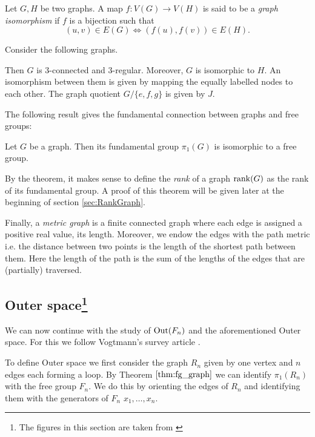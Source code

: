 \begin{definition}
	Let $G,H$ be two graphs. A map $f: V(G) \to V(H)$ is said to be a \emph{graph isomorphism} if $f$ is a bijection such that
	\[
		(u,v) \in E(G) \Leftrightarrow (f(u),f(v)) \in E(H)
	.\] 
\end{definition}

\begin{eg}\label{ex:gAuto}
	Consider the following graphs.

	Then $G$ is $3$-connected and $3$-regular. Moreover, $G$ is isomorphic to $H$.
	An isomorphism between them is given by mapping the equally labelled nodes to each other.
	The graph quotient $G / \{e,f,g\}$ is given by $J$.
\end{eg}

The following result gives the fundamental connection between graphs and free groups:
\begin{theorem}\label{thm:fg_graph}
	Let $G$ be a graph. Then its fundamental group $\pi_{1}(G)$ is isomorphic to a free group.
\end{theorem}
By the theorem, it makes sense to define the \emph{rank} of a graph $\rank(G)$ as the rank of its fundamental group.
A proof of this theorem will be given later at the beginning of section \ref{sec:RankGraph}.

Finally, a \emph{metric graph} is a finite connected graph where each edge is assigned a positive real value, its length. 
Moreover, we endow the edges with the path metric i.e.
the distance between two points is the length of the shortest path between them.
Here the length of the path is the sum of the lengths of the edges that are (partially) traversed.

\subsection{Outer space\texorpdfstring{\footnote{The figures in this section are taken from \cite{vogtmann02}}}{}}
We can now continue with the study of $\operatorname{Out}(F_{n})$ and the aforementioned Outer space. 
For this we follow Vogtmann's survey article \cite{vogtmann02}.

To define Outer space we first consider the graph $R_{n}$ given by one vertex and $n$ edges each forming a loop.
By Theorem $\ref{thm:fg_graph}$ we can identify $\pi_1(R_{n})$ with the free group $F_{n}$.
We do this by orienting the edges of $R_{n}$ and identifying them with the generators of $F_{n}$ $x_1,\ldots,x_{n}$.

